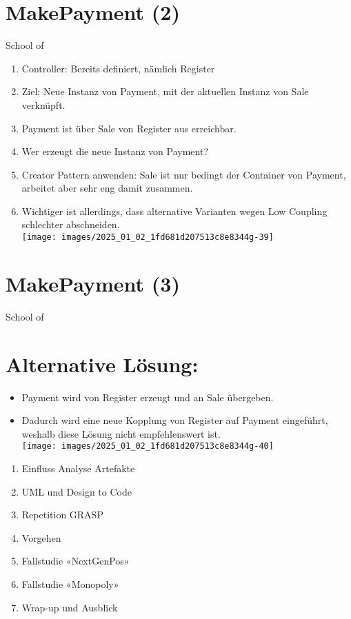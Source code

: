 \documentclass[10pt]{article}
\begin{document}
\section*{MakePayment (2)}
School of

\begin{enumerate}
  \item Controller: Bereits definiert, nämlich Register
  \item Ziel: Neue Instanz von Payment, mit der aktuellen Instanz von Sale verknüpft.
  \item Payment ist über Sale von Register aus erreichbar.
  \item Wer erzeugt die neue Instanz von Payment?
  \item Creator Pattern anwenden: Sale ist nur bedingt der Container von Payment, arbeitet aber sehr eng damit zusammen.
  \item Wichtiger ist allerdings, dass alternative Varianten wegen Low Coupling schlechter abschneiden.\\
\texttt{[image: images/2025\_01\_02\_1fd681d207513c8e8344g-39]}
\end{enumerate}

\section*{MakePayment (3)}
School of

\section*{Alternative Lösung:}
\begin{itemize}
  \item Payment wird von Register erzeugt und an Sale übergeben.
  \item Dadurch wird eine neue Kopplung von Register auf Payment eingeführt, weshalb diese Lösung nicht empfehlenswert ist.\\
\texttt{[image: images/2025\_01\_02\_1fd681d207513c8e8344g-40]}
\end{itemize}

\begin{enumerate}
  \item Einfluss Analyse Artefakte
  \item UML und Design to Code
  \item Repetition GRASP
  \item Vorgehen
  \item Fallstudie «NextGenPos»
  \item Fallstudie «Monopoly»
  \item Wrap-up und Ausblick
\end{enumerate}
\end{document}
